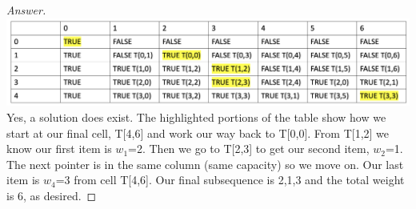 \documentclass[11pt]{article}
\theoremstyle{definition}
\theoremstyle{definition}
\theoremstyle{definition}
\begin{document}
\begin{proof}[Answer] $ $ \\ 
\includegraphics[width = 170 mm]{t1.png} \\
Yes, a solution does exist. The highlighted portions of the table show how we start at our final cell, T[4,6] and work our way back to T[0,0]. From T[1,2] we know our first item is $w_1$=2. Then we go to T[2,3] to get our second item, $w_2$=1. The next pointer is in the same column (same capacity) so we move on. Our last item is $w_4$=3 from cell T[4,6]. Our final subsequence is 2,1,3 and the total weight is 6, as desired. 
\end{proof}




\end{document}
